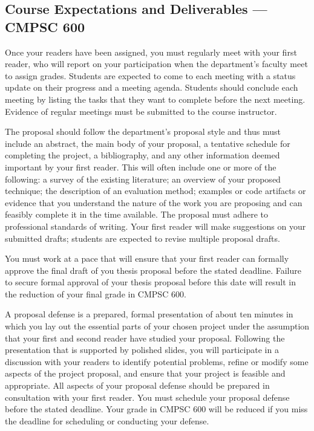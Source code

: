 \subsection*{Course Expectations and Deliverables --- CMPSC 600}

\medskip
{} Once your readers have been assigned, you must regularly meet with your first reader, who
will report on your participation when the department's faculty meet to assign grades.  Students are expected to come to
each meeting with a status update on their progress and a meeting agenda.  Students should conclude each meeting by
listing the tasks that they want to complete before the next meeting. Evidence of regular meetings must be submitted
to the course instructor.

\medskip
{}
The proposal should follow the department's proposal style and thus must include an abstract, the main body of your
proposal, a tentative schedule for completing the project, a bibliography, and any other information deemed important by
your first reader. This will often include one or more of the following: a survey of the existing literature; an overview of
your proposed technique; the description of an evaluation method; examples or code artifacts or evidence that you
understand the nature of the work you are proposing and can feasibly complete it in the time available.
The proposal must adhere to professional standards of writing. Your first reader will make suggestions on your submitted
drafts; students are expected to revise multiple proposal drafts.

%
%

You must work at a pace that will ensure that your first reader can formally approve the final draft of you thesis
proposal before the stated deadline.  Failure to secure formal approval of your thesis proposal before this date will
result in the reduction of your final grade in CMPSC 600.


\medskip
{}
A proposal defense is a prepared, formal presentation of about ten minutes in which you lay out the essential parts of
your chosen project under the assumption that your first and second reader have studied your proposal.  Following the
presentation that is supported by polished slides, you will participate in a discussion with your readers to identify
potential problems, refine or modify some aspects of the project proposal, and ensure that your project is feasible
and appropriate. All aspects of your proposal defense should be prepared in consultation with your first reader.
You must schedule your proposal defense before the stated deadline. Your grade in CMPSC 600 will be reduced if you miss the
deadline for scheduling or conducting your defense.

